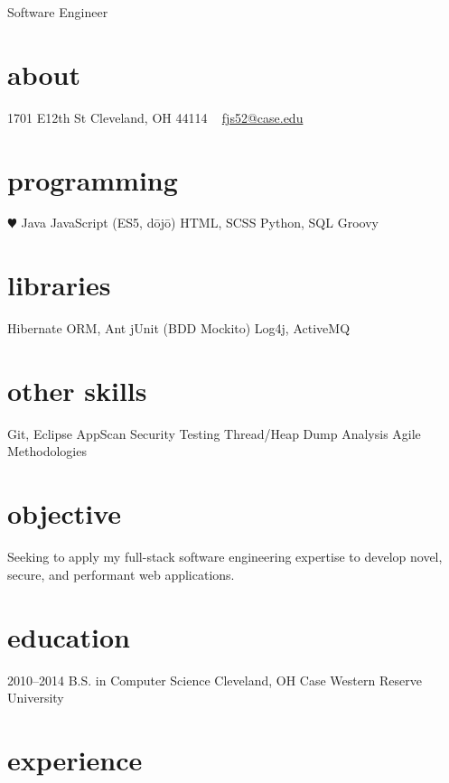 \documentclass[]{friggeri-cv}
\begin{document}
       {Software Engineer}


\begin{aside}
  \section{about}
    1701 E12th St
    Cleveland, OH
    44114
    ~
    \href{mailto:fjs52@case.edu}{fjs52@case.edu}
  \section{programming}
    {\color{red} $\varheartsuit$} Java
    JavaScript
    (ES5, d\={o}j\={o})
    HTML, SCSS
    Python, SQL
    Groovy
  \section{libraries}
    Hibernate ORM, Ant
    jUnit (BDD Mockito)
    Log4j, ActiveMQ
  \section{other skills}
    Git, Eclipse
    AppScan Security Testing
    Thread/Heap Dump Analysis
    Agile Methodologies
\end{aside}

\section{objective}
Seeking to apply my full-stack software engineering expertise to develop novel, secure, and performant web applications.

\section{education}

\begin{entrylist}
  \entry
    {2010–2014}
    {B.S. in Computer Science}
    {Cleveland, OH}
    {Case Western Reserve University}
\end{entrylist}

\section{experience}
\end{document}
